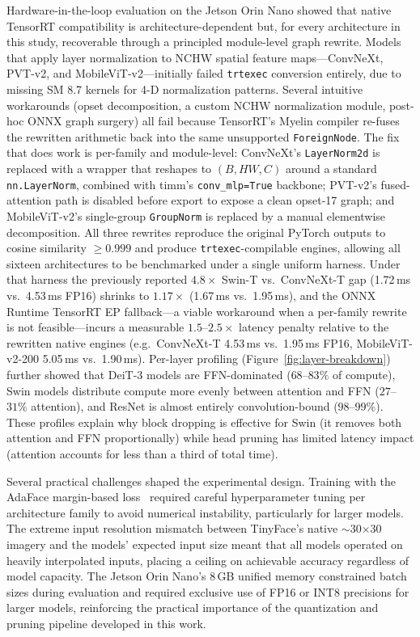 \documentclass[runningheads,a4paper]{llncs}
\begin{document}
Hardware-in-the-loop evaluation on the Jetson Orin Nano showed that native TensorRT compatibility is architecture-dependent but, for every architecture in this study, recoverable through a principled module-level graph rewrite. Models that apply layer normalization to NCHW spatial feature maps---ConvNeXt, PVT-v2, and MobileViT-v2---initially failed \texttt{trtexec} conversion entirely, due to missing SM 8.7 kernels for 4-D normalization patterns. Several intuitive workarounds (opset decomposition, a custom NCHW normalization module, post-hoc ONNX graph surgery) all fail because TensorRT's Myelin compiler re-fuses the rewritten arithmetic back into the same unsupported \texttt{ForeignNode}. The fix that does work is per-family and module-level: ConvNeXt's \texttt{LayerNorm2d} is replaced with a wrapper that reshapes to $(B,HW,C)$ around a standard \texttt{nn.LayerNorm}, combined with timm's \texttt{conv\_mlp=True} backbone; PVT-v2's fused-attention path is disabled before export to expose a clean opset-17 graph; and MobileViT-v2's single-group \texttt{GroupNorm} is replaced by a manual elementwise decomposition. All three rewrites reproduce the original PyTorch outputs to cosine similarity $\geq 0.999$ and produce \texttt{trtexec}-compilable engines, allowing all sixteen architectures to be benchmarked under a single uniform harness. Under that harness the previously reported $4.8\times$ Swin-T vs.\ ConvNeXt-T gap (1.72\,ms vs.\ 4.53\,ms FP16) shrinks to $1.17\times$ (1.67\,ms vs.\ 1.95\,ms), and the ONNX Runtime TensorRT EP fallback---a viable workaround when a per-family rewrite is not feasible---incurs a measurable $1.5$--$2.5\times$ latency penalty relative to the rewritten native engines (e.g.\ ConvNeXt-T 4.53\,ms vs.\ 1.95\,ms FP16, MobileViT-v2-200 5.05\,ms vs.\ 1.90\,ms). Per-layer profiling (Figure~\ref{fig:layer-breakdown}) further showed that DeiT-3 models are FFN-dominated ($68$--$83\%$ of compute), Swin models distribute compute more evenly between attention and FFN ($27$--$31\%$ attention), and ResNet is almost entirely convolution-bound ($98$--$99\%$). These profiles explain why block dropping is effective for Swin (it removes both attention and FFN proportionally) while head pruning has limited latency impact (attention accounts for less than a third of total time).

Several practical challenges shaped the experimental design. Training with the AdaFace margin-based loss~\cite{narayan2025petalface} required careful hyperparameter tuning per architecture family to avoid numerical instability, particularly for larger models. The extreme input resolution mismatch between TinyFace's native $\sim$30$\times$30 imagery and the models' expected input size meant that all models operated on heavily interpolated inputs, placing a ceiling on achievable accuracy regardless of model capacity. The Jetson Orin Nano's 8\,GB unified memory constrained batch sizes during evaluation and required exclusive use of FP16 or INT8 precisions for larger models, reinforcing the practical importance of the quantization and pruning pipeline developed in this work.
\end{document}
